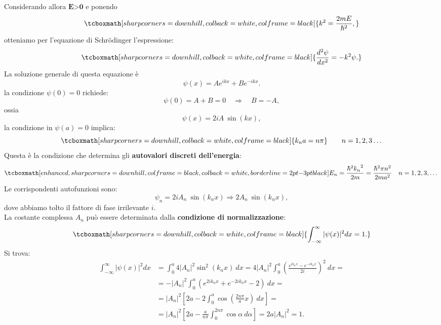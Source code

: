 Considerando allora $\textbf{E>0}$ e ponendo
	\begin{equation}
		\tcboxmath[sharp corners=downhill, colback=white, colframe=black]{
			k ^2 = \frac{2mE}{\hbar ^2},
			}
	\end{equation}
otteniamo per l'equazione di Schr\"{o}dinger l'espressione:
	\begin{equation}
		\tcboxmath[sharp corners=downhill, colback=white, colframe=black]{
			\frac{d^2 \psi}{dx^2}=-k ^2\psi.
			}
	\end{equation}
La soluzione generale di questa equazione è
	\begin{equation}
		\psi(x)= Ae^{ik x}+ Be^{-ik x}.
	\end{equation}
la condizione $\psi (0)=0$ richiede:
	\begin{equation}
		\psi(0)= A+ B=0 \quad \Rightarrow \quad B=-A,
	\end{equation}
ossia
	\begin{equation}
		\psi(x)= 2iA\ \sin{\left( k x \right)},
	\end{equation}
la condizione in $\psi (a)=0$ implica:
	\begin{equation}
		\tcboxmath[sharp corners=downhill, colback=white, colframe=black]{
			k_n a= n\pi
			} \qquad n=1,2,3\dots			
	\end{equation}
Questa è la condizione che determina gli \textbf{autovalori discreti dell'energia}:
	\begin{equation}
		\tcboxmath[enhanced, sharp corners=downhill, colframe=black, colback=white, borderline={2pt}{-3pt}{black}]{
			E_n= \frac{\hbar ^2 {k_n}^2}{2m}=\frac{\hbar ^2 \pi n^2}{2ma^2}
			} \quad n=1,2,3,\dots
	\end{equation}
Le corrispondenti autofunzioni sono:
	\begin{equation}
		\psi _n = 2iA_n\ \sin{\left( k_n x\right)} \Rightarrow 2A_n\ \sin{\left( k_n x \right)},
	\end{equation}
dove abbiamo tolto il fattore di fase irrilevante $i$.\\
La costante complessa $A_n$ può essere determinata dalla \textbf{condizione di normalizzazione}:
	\begin{equation}
		\tcboxmath[sharp corners=downhill, colback=white, colframe=black]{
			\int _{-\infty} ^{\infty} |\psi(x)| ^2 dx =1.
			}
	\end{equation}
Si trova:
	\begin{align}
		\int _{-\infty} ^{\infty} |\psi(x)| ^2 dx &= \int _{0} ^{a} 4|A_n| ^2 \sin ^2 {\left( k_n x \right)}\ dx= 4|A_n| ^2 \int _{0} ^{a} \left( \frac{e^{ik_n x}- e^{-ik_nx}}{2i}\right) ^2\ dx = \nonumber \\ 
		&= -|A_n| ^2 \int _{0} ^{a} \left( e^{2ik_n x}+ e^{-2ik_nx}-2\right)\  dx = \nonumber \\
		&= |A_n| ^2 \left[ 2a- 2 \int _{0} ^{a} \cos \left(\frac{2n \pi}{a} x\right)\   dx \right] = \nonumber \\
		&= |A_n| ^2 \left[ 2a- \frac{a}{n\pi} \int _{0} ^{2n\pi} \cos \alpha\   d\alpha \right] = 2a|A_n|^2= 1.
	\end{align}
